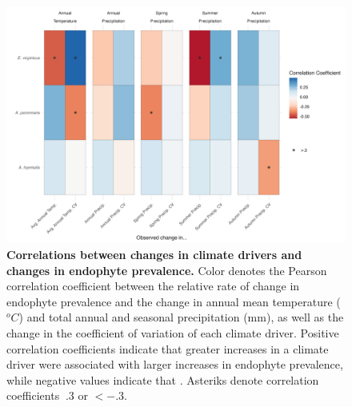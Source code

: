 \documentclass[11pt]{article}
\newcommand{\tom}[2]{{\color{red}{#1}}\footnote{\textit{\color{red}{#2}}}}
\begin{document}

\begin{figure}[H]
	\centering
	\includegraphics[width = \linewidth]{climate_corr_heatmap.png}
	\caption{\textbf{Correlations between changes in climate drivers and changes in endophyte prevalence.} Color denotes the Pearson correlation coefficient between the relative rate of change in endophyte prevalence and the change in annual mean temperature ($^oC$) and total annual and seasonal precipitation (mm), as well as the change in the coefficient of variation of each climate driver. Positive correlation coefficients indicate that greater increases in a climate driver were associated with larger increases in endophyte prevalence, while negative values indicate that . Asteriks denote correlation coefficients $\> .3$ or $< -.3$.}
\end{figure}
\end{document}
